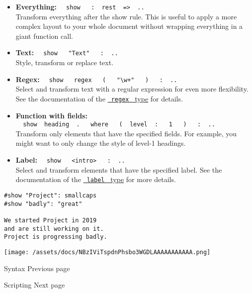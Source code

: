 \begin{itemize}
\item
  \textbf{Everything:}
  \texttt{\ }{\texttt{\ show\ }}\texttt{\ }{\texttt{\ :\ }}\texttt{\ rest\ }{\texttt{\ =\textgreater{}\ }}\texttt{\ ..\ }\\
  Transform everything after the show rule. This is useful to apply a
  more complex layout to your whole document without wrapping everything
  in a giant function call.
\item
  \textbf{Text:}
  \texttt{\ }{\texttt{\ show\ }}\texttt{\ }{\texttt{\ "Text"\ }}\texttt{\ }{\texttt{\ :\ }}\texttt{\ ..\ }\\
  Style, transform or replace text.
\item
  \textbf{Regex:}
  \texttt{\ }{\texttt{\ show\ }}\texttt{\ }{\texttt{\ regex\ }}\texttt{\ }{\texttt{\ (\ }}\texttt{\ }{\texttt{\ "\textbackslash{}w+"\ }}\texttt{\ }{\texttt{\ )\ }}\texttt{\ }{\texttt{\ :\ }}\texttt{\ ..\ }\\
  Select and transform text with a regular expression for even more
  flexibility. See the documentation of the
  \href{/docs/reference/foundations/regex/}{\texttt{\ regex\ } type} for
  details.
\item
  \textbf{Function with fields:}
  \texttt{\ }{\texttt{\ show\ }}\texttt{\ heading\ }{\texttt{\ .\ }}\texttt{\ }{\texttt{\ where\ }}\texttt{\ }{\texttt{\ (\ }}\texttt{\ level\ }{\texttt{\ :\ }}\texttt{\ }{\texttt{\ 1\ }}\texttt{\ }{\texttt{\ )\ }}\texttt{\ }{\texttt{\ :\ }}\texttt{\ ..\ }\\
  Transform only elements that have the specified fields. For example,
  you might want to only change the style of level-1 headings.
\item
  \textbf{Label:}
  \texttt{\ }{\texttt{\ show\ }}\texttt{\ }{\texttt{\ \textless{}intro\textgreater{}\ }}\texttt{\ }{\texttt{\ :\ }}\texttt{\ ..\ }\\
  Select and transform elements that have the specified label. See the
  documentation of the
  \href{/docs/reference/foundations/label/}{\texttt{\ label\ } type} for
  more details.
\end{itemize}

\begin{verbatim}
#show "Project": smallcaps
#show "badly": "great"

We started Project in 2019
and are still working on it.
Project is progressing badly.
\end{verbatim}

\texttt{[image: /assets/docs/NBzIViTspdnPhsbo3WGDLAAAAAAAAAAA.png]}

\href{/docs/reference/syntax/}{\pandocbounded{}}

{ Syntax } { Previous page }

\href{/docs/reference/scripting/}{\pandocbounded{}}

{ Scripting } { Next page }
